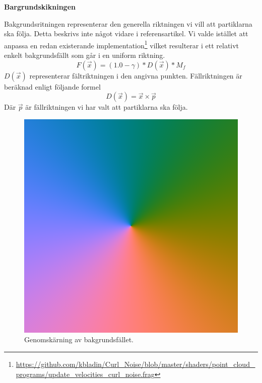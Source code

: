 \documentclass[a4paper]{article}
\begin{document}
\begin{multicols}{2}
\textbf{Bargrundskikningen}

Bakgrundsritningen representerar den generella riktningen vi vill att partiklarna ska följa. Detta beskrivs inte något vidare i referensartikel. Vi valde istället att anpassa en redan existerande implementation\footnote{\url{https://github.com/kbladin/Curl_Noise/blob/master/shaders/point_cloud_programs/update_velocities_curl_noise.frag}} vilket resulterar i ett relativt enkelt bakgrundsfällt som går i en uniform riktning.
\begin{equation}
    F(\vec{x}) = (1.0-\gamma) * D(\vec{x}) * M_f
\end{equation}
$D(\vec{x})$ representerar fältriktningen i den angivna punkten. Fällriktningen är beräknad enligt följande formel
\begin{equation}
   D(\vec{x}) = \vec{x} \times \vec{p}
\end{equation}
Där $\vec{p}$ är fällriktningen vi har valt att partiklarna ska följa.

\begin{figure}[H]
\center
\begin{minipage}[]{0.3\textwidth}
\includegraphics[width=\textwidth]{share/Background.png}
\caption{Genomskärning av bakgrundsfället.}
\end{minipage}
\end{figure}


\end{multicols}
\end{document}
